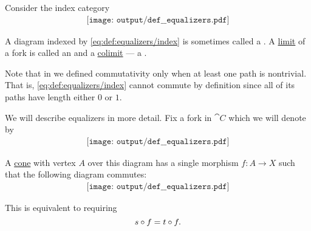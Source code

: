 \begin{definition}\label{def:equalizers}
  Consider the index category
  \begin{equation}\label{eq:def:equalizers/index}
    \begin{aligned}
      \texttt{[image: output/def\_\_equalizers.pdf]}
    \end{aligned}
  \end{equation}

  A diagram indexed by \eqref{eq:def:equalizers/index} is sometimes called a . A \hyperref[def:category_of_cones/limit]{limit} of a fork is called an  and a \hyperref[def:category_of_cones/colimit]{colimit} --- a .

  Note that in  we defined commutativity only when at least one path is nontrivial. That is, \eqref{eq:def:equalizers/index} cannot commute by definition since all of its paths have length either \( 0 \) or \( 1 \).

  We will describe equalizers in more detail. Fix a fork in \( \cat{C} \) which we will denote by
  \begin{equation}\label{eq:def:equalizers/raw_diagram}
    \begin{aligned}
      \texttt{[image: output/def\_\_equalizers.pdf]}
    \end{aligned}
  \end{equation}

  \begin{minipage}[t]{0.47\textwidth}
    A \hyperref[def:category_of_cones/cone]{cone} with vertex \( A \) over this diagram has a single morphism \( f: A \to X \) such that the following diagram commutes:
    \begin{equation}\label{eq:def:equalizers/cone}
      \begin{aligned}
        \texttt{[image: output/def\_\_equalizers.pdf]}
      \end{aligned}
    \end{equation}

    This is equivalent to requiring
    \begin{equation*}
      s \bincirc f = t \bincirc f.
    \end{equation*}


\end{minipage}
\end{definition}
